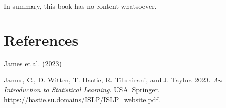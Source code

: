\documentclass[
  letterpaper,
  DIV=11,
  numbers=noendperiod]{scrreprt}
\newlength{\cslhangindent}
\newenvironment{CSLReferences}[2] %
 {\begin{list}{}{%
  \setlength{\itemindent}{0pt}
  \setlength{\leftmargin}{0pt}
  \setlength{\parsep}{0pt}
  \ifodd #1
   \setlength{\leftmargin}{\cslhangindent}
   \setlength{\itemindent}{-1\cslhangindent}
  \fi
  \setlength{\itemsep}{#2\baselineskip}}}
 {\end{list}}
\begin{document}
In summary, this book has no content whatsoever.


\chapter*{References}\label{references}


James et al. (2023)

\label{refs}
\begin{CSLReferences}{1}{0}
James, G., D. Witten, T. Hastie, R. Tibshirani, and J. Taylor. 2023.
\emph{An Introduction to Statistical Learning}. USA: Springer.
\url{https://hastie.su.domains/ISLP/ISLP_website.pdf}.

\end{CSLReferences}
\end{document}

